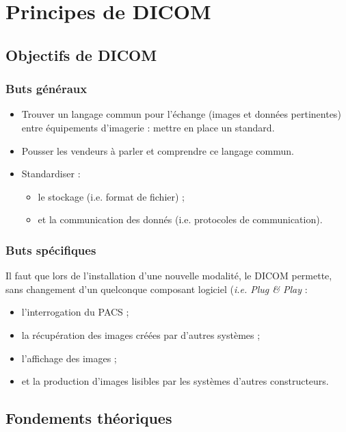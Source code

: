\section{Principes de DICOM}

	\subsection{Objectifs de DICOM}
	
	\frame
	{
		\frametitle{Buts g\'en\'eraux}
		\begin{itemize}
			\item<1-> Trouver un langage commun pour l'\'echange (images et donn\'ees pertinentes) entre \'equipements d'imagerie : mettre en place un standard.
			\item<2-> Pousser les vendeurs \`a parler et comprendre ce langage commun.
			\item<3-> Standardiser :
			\begin{itemize}
				\item<4-> le stockage (i.e. format de fichier) ;
				\item<5-> et la communication des donn\'es (i.e. protocoles de communication).
			\end{itemize}
		\end{itemize}
	}
	
	\frame
	{
		\frametitle{Buts sp\'ecifiques}
		
		Il faut que lors de l'installation d'une nouvelle modalit\'e, le DICOM permette, sans changement d'un quelconque composant logiciel (\emph{i.e. Plug \& Play} :
		\begin{itemize}
			\item<1-> l'interrogation du PACS ;
			\item<2-> la r\'ecup\'eration des images cr\'e\'ees par d'autres syst\`emes ;
			\item<3-> l'affichage des images ;
			\item<4-> et la production d'images lisibles par les syst\`emes d'autres constructeurs.
		\end{itemize}
	}

	\subsection{Fondements th\'eoriques}

